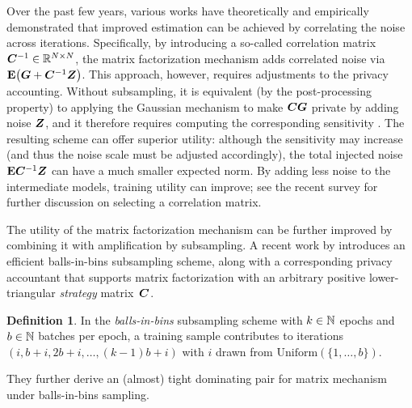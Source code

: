 \documentclass{article}
\theoremstyle{plain}
\theoremstyle{definition}
\newtheorem{definition}[theorem]{Definition}
\theoremstyle{remark}
\begin{document}
Over the past few years, various works have theoretically and empirically demonstrated that improved estimation can be achieved by correlating the noise across iterations. Specifically, by introducing a so-called correlation matrix ${\bm{C}}^{-1} \in {\mathbb{R}}^{N \times N}$, the matrix factorization mechanism \citep{li2015matrix} adds correlated noise via $\mathbf{E}\bigl({\bm{G}} + {\bm{C}}^{-1}{\bm{Z}}\bigr)$. This approach, however, requires adjustments to the privacy accounting. Without subsampling, it is equivalent (by the post-processing property) to applying the Gaussian mechanism to make ${\bm{C}}{\bm{G}}$ private by adding noise ${\bm{Z}}$, and it therefore requires computing the corresponding sensitivity \citep{choquette-choo2023amplified}. The resulting scheme can offer superior utility: although the sensitivity may increase (and thus the noise scale must be adjusted accordingly), the total injected noise $\mathbf{E}{\bm{C}}^{-1}{\bm{Z}}$ can have a much smaller expected norm. By adding less noise to the intermediate models, training utility can improve; see the recent survey \citep{pillutla2025correlated} for further discussion on selecting a correlation matrix.



The utility of the matrix factorization mechanism can be further improved by combining it with amplification by subsampling. A recent work by \citet{choquette2024near} introduces an efficient balls-in-bins subsampling scheme, along with a corresponding privacy accountant that supports matrix factorization with an arbitrary positive lower-triangular \emph{strategy} matrix~${\bm{C}}$.


\begin{definition}
    In the \emph{balls-in-bins} subsampling scheme with $k \in {\mathbb{N}}$ epochs and $b \in {\mathbb{N}} $ batches per epoch,
    a training sample contributes to iterations $(i, b + i, 2b + i, \dots, (k-1)b + i)$ with $i$ drawn from $\mathrm{Uniform}(\{1,\dots, b\})$.
\end{definition}
They further derive an (almost) tight dominating pair for matrix mechanism under balls-in-bins sampling.
\end{document}
